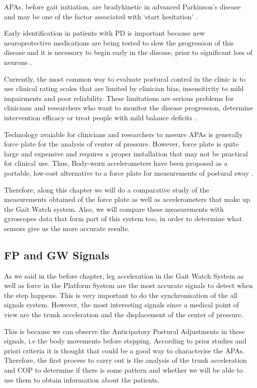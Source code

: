 APAs, before gait initiation, are bradykinetic in advanced Parkinson’s disease and may be one of the factor associated with ‘start hesitation’ \cite{Mancini2009} .

Early identification in patients with PD is important because new neuroprotective medications are being tested to slow the progression of this disease and it is necessary to begin early in the disease, prior to significant loss of neurons \cite{Mancini2012} . 

Currently, the most common way to evaluate postural control in the clinic is to use clinical rating scales that are limited by clinician bias, insensitivity to mild impairments and poor reliability. These limitations are serious problems for clinicians and researchers who want to monitor the disease progression, determine intervention efficacy or treat people with mild balance deficits \cite{Mancini2012} .

Technology avaiable for clinicians and researchers to mesure APAs is generally force plate for the analysis of center of pressure. However, force plate is quite large and expensive and requires a proper installation that may not be practical for clinical use. Thus, Body-worn accelerometers have been proposed as a portable, low-cost alternative to a force plate for measurements of postural sway\cite{Mancini2012} .
 
Therefore, along this chapter we will do a comparative study of the measurements obtained of the force plate as well as accelerometers that make up the Gait Watch system. Also, we will compare these measurements with gyroscopes data that form part of this system too, in order to determine what sensors give us the more accurate results.

\subsection{FP and GW Signals}
As we said in the before chapter, leg acceleration in the Gait Watch System as well as force in the Platform System are the most accurate signals to detect when the step happens. This is very important to do the synchronisation of the all signals system. However, the most interesting signals since a medical point of view are the trunk acceleration and the displacement of the center of pressure.

This is because we can observe the Anticipatory Postural Adjustments in these signals, i.e the body movements before stepping. According to prior studies and priori criteria it is thought that could be a good way to characterise the APAs.
Therefore, the first process to carry out is the analysis of the trunk acceleration and COP to determine if there is some pattern and whether we will be able to use them to obtain information about the patients.

